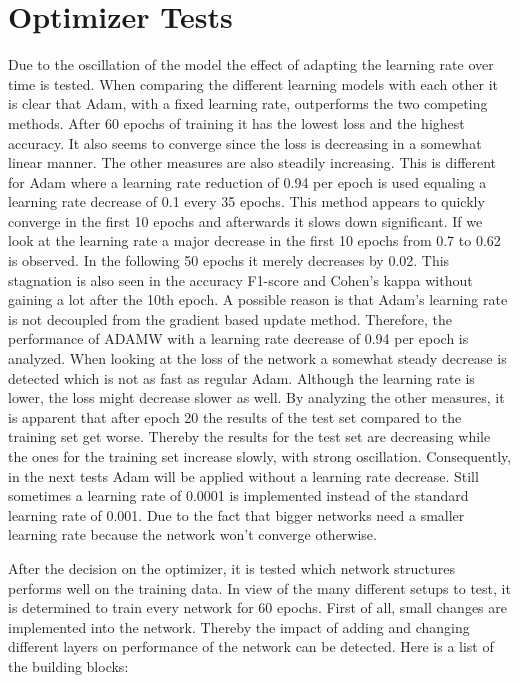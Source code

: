 \documentclass[
a4paper, 
12pt,
grayscalebody, %
abstract=on,
twoside, BCOR10mm, 12pt, DIV13,headinclude, footexclude, final, abstracton, openright
]{ibireprt}
\numberwithin{equation}{chapter}
\numberwithin{table}{chapter}
\numberwithin{figure}{chapter}
\numberwithin{algorithm}{chapter}
\numberwithin{example}{chapter}
\numberwithin{example}{chapter}
\begin{document}
\section{Optimizer Tests}
Due to the oscillation of the model the effect of adapting the learning rate over time is tested. When comparing the different learning models with each other it is clear that Adam, with a fixed learning rate, outperforms the two competing methods. After 60 epochs of training it has the lowest loss and the highest accuracy. It also seems to converge since the loss is decreasing in a somewhat linear manner. The other measures are also steadily increasing. This is different for Adam where a learning rate reduction of 0.94 per epoch is used equaling a learning rate decrease of 0.1 every 35 epochs. This method appears to quickly converge in the first 10 epochs and afterwards it slows down significant. If we look at the learning rate a major decrease in the first 10 epochs from 0.7 to 0.62 is observed. In the following 50 epochs it merely decreases by 0.02. This stagnation is also seen in the accuracy F1-score and Cohen's kappa without gaining a lot after the 10th epoch. A possible reason is that Adam's learning rate is not decoupled from the gradient based update method. Therefore, the performance of ADAMW with a learning rate decrease of 0.94 per epoch is analyzed. When looking at the loss of the network a somewhat steady decrease is detected which is not as fast as regular Adam. Although the learning rate is lower, the loss might decrease slower as well. By analyzing the other measures, it is apparent that after epoch 20 the results of the test set compared to the training set get worse. Thereby the results for the test set are decreasing while the ones for the training set increase slowly, with strong oscillation. Consequently, in the next tests Adam will be applied without a learning rate decrease. Still sometimes a learning rate of 0.0001 is implemented instead of the standard learning rate of 0.001. Due to the fact that bigger networks need a smaller learning rate because the network won't converge otherwise.



After the decision on the optimizer, it is tested which network structures performs well on the training data. In view of the many different setups to test, it is determined to train every network for 60 epochs. First of all, small changes are implemented into the network. Thereby the impact of adding and changing different layers on performance of the network can be detected. Here is a list of the building blocks:
\end{document}
